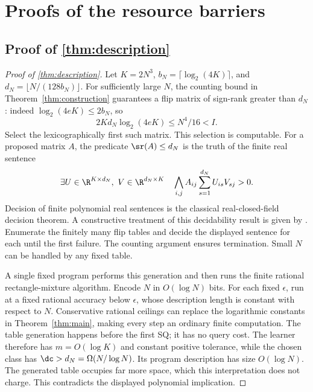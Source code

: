 \section{Proofs of the resource barriers}\label{app:barrier-proofs}
\subsection[Proof of result description]{Proof of \cref{thm:description}}\label{proof:description}
\begin{proof}[Proof of \cref{thm:description}]
Let $K=2N^3$, $b_N=\lceil\log_2(4K)\rceil$, and $d_N=\lfloor N/(128b_N)\rfloor$. For sufficiently large $N$, the counting bound in Theorem~\ref{thm:construction} guarantees a flip matrix of sign-rank greater than $d_N$: indeed $\log_2(4eK)\le2b_N$, so
\[
 2Kd_N\log_2(4eK)\le N^4/16<I.
\]
Select the lexicographically first such matrix. This selection is computable. For a proposed matrix $A$, the predicate $\sr(A)\le d_N$ is the truth of the finite real sentence
\[
 \exists U\in\R^{K\times d_N},\ V\in\R^{d_N\times K}\quad
 \bigwedge_{i,j} A_{ij}\sum_{s=1}^{d_N}U_{is}V_{sj}>0.
\]
Decision of finite polynomial real sentences is the classical real-closed-field decision theorem. A constructive treatment of this decidability result is given by \citet{MC12}. Enumerate the finitely many flip tables and decide the displayed sentence for each until the first failure. The counting argument ensures termination. Small $N$ can be handled by any fixed table.

A single fixed program performs this generation and then runs the finite rational rectangle-mixture algorithm. Encode $N$ in $O(\log N)$ bits. For each fixed $\epsilon$, run at a fixed rational accuracy below $\epsilon$, whose description length is constant with respect to $N$. Conservative rational ceilings can replace the logarithmic constants in Theorem~\ref{thm:main}, making every step an ordinary finite computation. The table generation happens before the first SQ; it has no query cost. The learner therefore has $m=O(\log K)$ and constant positive tolerance, while the chosen class has $\dc>d_N=\Omega(N/\log N)$. Its program description has size $O(\log N)$. The generated table occupies far more space, which this interpretation does not charge. This contradicts the displayed polynomial implication.
\end{proof}

